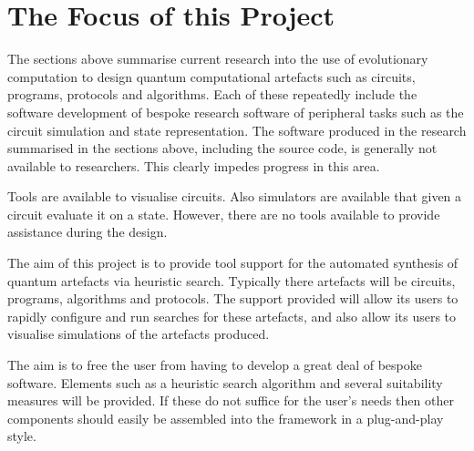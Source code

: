 \section{The Focus of this Project}
\label{sec:focusofproject}
The sections above summarise current research into the use of evolutionary computation to design quantum computational artefacts such as circuits, programs, protocols and algorithms.
Each of these repeatedly include the software development of bespoke research software of peripheral tasks such as the circuit simulation and state representation.
The software produced in the research summarised in the sections above, including the source code, is generally not available to researchers.
This clearly impedes progress in this area.


Tools are available to visualise circuits.
Also simulators are available that given a circuit evaluate it on a state.
However, there are no tools available to provide assistance during the design.

The aim of this project is to provide tool support for the automated synthesis of quantum artefacts via heuristic search.
Typically there artefacts will be circuits, programs, algorithms and protocols.
The support provided will allow its users to rapidly configure and run searches for these artefacts, and also allow its users to visualise simulations of the artefacts produced.

The aim is to free the user from having to develop a great deal of bespoke software.
Elements such as a heuristic search algorithm and several suitability measures will be provided.
If these do not suffice for the user's needs then other components should easily be assembled into the framework in a plug-and-play style.

